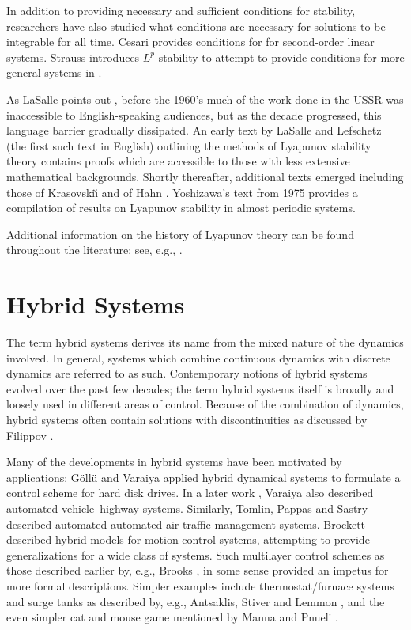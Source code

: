 In addition to providing necessary and sufficient conditions for stability,
researchers have also studied what conditions are necessary for solutions to be
integrable for all time.
%
Cesari provides conditions for \cite[\S 1.5]{Cesari1971} for second-order linear
systems.
%
Strauss introduces $L^{p}$ stability to attempt to provide conditions for more
general systems in \cite{Strauss1965}.

As LaSalle points out \cite{LaSalle1964}, before the 1960's much of the work
done in the USSR was inaccessible to English-speaking audiences, but as the
decade progressed, this language barrier gradually dissipated.
%
An early text by LaSalle and Lefschetz (the first such text in English)
\cite{LaSalle1961} outlining the methods of Lyapunov stability theory contains
proofs which are accessible to those with less extensive mathematical
backgrounds.
%
Shortly thereafter, additional texts emerged including those of Krasovski\u{\i}
\cite{Krasovskii1963} and of Hahn \cite{Hahn1967}.
%
Yoshizawa's text from 1975 \cite{Yoshizawa1975} provides a compilation of
results on Lyapunov stability in almost periodic systems.

Additional information on the history of Lyapunov theory can be found throughout
the literature; see, e.g., \cite{Michel2007,Teel1999}.
%

\section{Hybrid Systems}

The term hybrid systems derives its name from the mixed nature of the dynamics
involved.
%
In general, systems which combine continuous dynamics with discrete dynamics are
referred to as such.
%
Contemporary notions of hybrid systems evolved over the past few decades;
%
the term hybrid systems itself is broadly and loosely used in different areas of
control.
%
Because of the combination of dynamics, hybrid systems often contain solutions
with discontinuities as discussed by Filippov \cite{Filippov1988}.

Many of the developments in hybrid systems have been motivated by applications:
%
G{\"{o}}ll{\"{u}} and Varaiya \cite{Gollu1989} applied hybrid dynamical systems to
formulate a control scheme for hard disk drives.
%
In a later work \cite{Varaiya1993}, Varaiya also described automated
vehicle--highway systems.
%
Similarly, Tomlin, Pappas and Sastry \cite{Tomlin1998} described automated
automated air traffic management systems.
%
Brockett \cite{Brockett1993} described hybrid models for motion control systems,
attempting to provide generalizations for a wide class of systems.
%
Such multilayer control schemes as those described earlier by, e.g., Brooks
\cite{Brooks1986}, in some sense provided an impetus for more formal
descriptions.
%
Simpler examples include thermostat/furnace systems and surge tanks as described
by, e.g., Antsaklis, Stiver and Lemmon \cite{Antsaklis1993}, and the even
simpler cat and mouse game mentioned by Manna and Pnueli \cite{Manna1993}.

